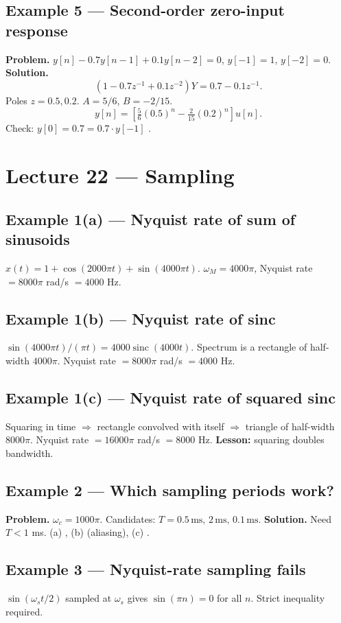\documentclass[11pt]{article}
\begin{document}
\subsection{Example 5 --- Second-order zero-input response}
\textbf{Problem.} $y[n]-0.7 y[n-1]+0.1 y[n-2]=0$, $y[-1]=1$, $y[-2]=0$.
\textbf{Solution.}
\[(1-0.7 z^{-1}+0.1 z^{-2})Y=0.7-0.1 z^{-1}.\]
Poles $z=0.5,0.2$. $A=5/6$, $B=-2/15$.
\[y[n]=\left[\tfrac{5}{6}(0.5)^n-\tfrac{2}{15}(0.2)^n\right]u[n].\]
Check: $y[0]=0.7=0.7\cdot y[-1]$ \checkmark.

\section{Lecture 22 --- Sampling}

\subsection{Example 1(a) --- Nyquist rate of sum of sinusoids}
$x(t)=1+\cos(2000\pi t)+\sin(4000\pi t)$. $\omega_M=4000\pi$, Nyquist rate $=8000\pi$ rad/s $=4000$ Hz.

\subsection{Example 1(b) --- Nyquist rate of sinc}
$\sin(4000\pi t)/(\pi t)=4000\operatorname{sinc}(4000 t)$. Spectrum is a rectangle of half-width $4000\pi$. Nyquist rate $=8000\pi$ rad/s $=4000$ Hz.

\subsection{Example 1(c) --- Nyquist rate of squared sinc}
Squaring in time $\Rightarrow$ rectangle convolved with itself $\Rightarrow$ triangle of half-width $8000\pi$. Nyquist rate $=16000\pi$ rad/s $=8000$ Hz. \textbf{Lesson:} squaring doubles bandwidth.

\subsection{Example 2 --- Which sampling periods work?}
\textbf{Problem.} $\omega_c=1000\pi$. Candidates: $T=0.5\,\mathrm{ms},\,2\,\mathrm{ms},\,0.1\,\mathrm{ms}$.
\textbf{Solution.} Need $T<1$ ms. (a) \checkmark, (b)  (aliasing), (c) \checkmark.

\subsection{Example 3 --- Nyquist-rate sampling fails}
$\sin(\omega_s t/2)$ sampled at $\omega_s$ gives $\sin(\pi n)=0$ for all $n$. Strict inequality required.
\end{document}
